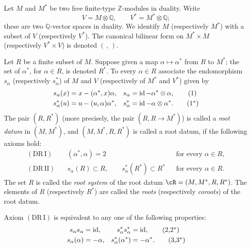 \begin{definition}\label{sga3:XXI:1.1.1}
Let \(M\) and \(M^\ast\) be two free finite-type \(\mathbb Z\)-modules
in duality. Write
\[
  V=M\otimes\mathbb Q,\qquad V^\ast=M^\ast\otimes\mathbb Q;
\]
these are two \(\mathbb Q\)-vector spaces in duality. We identify \(M\)
(respectively \(M^\ast\)) with a subset of \(V\) (respectively
\(V^\ast\)). The canonical bilinear form on
\(M^\ast\times M\) (respectively \(V^\ast\times V\)) is denoted
\((\, ,\,)\).

Let \(R\) be a finite subset of \(M\). Suppose given a map
\(\alpha\mapsto\alpha^\ast\) from \(R\) to \(M^\ast\); the set of
\(\alpha^\ast\), for \(\alpha\in R\), is denoted \(R^\ast\).
To every \(\alpha\in R\) associate the endomorphism \(s_\alpha\)
(respectively \(s_\alpha^\ast\)) of \(M\) and \(V\) (respectively of
\(M^\ast\) and \(V^\ast\)) given by
\begin{align}
 s_\alpha(x)&=x-(\alpha^\ast,x)\alpha,
 &s_\alpha&=\operatorname{id}-\alpha^\ast\otimes\alpha,
 \tag{1}\label{sga3:XXI:eq:1}\\
 s_\alpha^\ast(u)&=u-(u,\alpha)\alpha^\ast,
 &s_\alpha^\ast&=\operatorname{id}-\alpha\otimes\alpha^\ast.
 \tag{1${}^\ast$}\label{sga3:XXI:eq:1star}
\end{align}
The pair \((R,R^\ast)\) (more precisely, the pair
\((R,R\to M^\ast)\)) is called a \emph{root datum} in
\((M,M^\ast)\), and \((M,M^\ast,R,R^\ast)\) is called a root datum,
if the following axioms hold:
\begin{align*}
 (\mathrm{DR\,I})\quad&
    (\alpha^\ast,\alpha)=2
    &&\text{for every }\alpha\in R,\\
 (\mathrm{DR\,II})\quad&
    s_\alpha(R)\subset R,\qquad
    s_\alpha^\ast(R^\ast)\subset R^\ast
    &&\text{for every }\alpha\in R.
\end{align*}
The set \(R\) is called the \emph{root system} of the root datum
\(\cR=(M,M^\ast,R,R^\ast)\). The elements of \(R\) (respectively
\(R^\ast\)) are called the \emph{roots} (respectively
\emph{coroots}) of the root datum.
\end{definition}

\begin{remark}\label{sga3:XXI:1.1.2}
Axiom \((\mathrm{DR\,I})\) is equivalent to any one of the following
properties:
\begin{align}
 s_\alpha s_\alpha&=\operatorname{id},
 &s_\alpha^\ast s_\alpha^\ast&=\operatorname{id},
 \tag{2,2${}^\ast$}\label{sga3:XXI:eq:2}\\
 s_\alpha(\alpha)&=-\alpha,
 &s_\alpha^\ast(\alpha^\ast)&=-\alpha^\ast.
 \tag{3,3${}^\ast$}\label{sga3:XXI:eq:3}
\end{align}
\end{remark}

